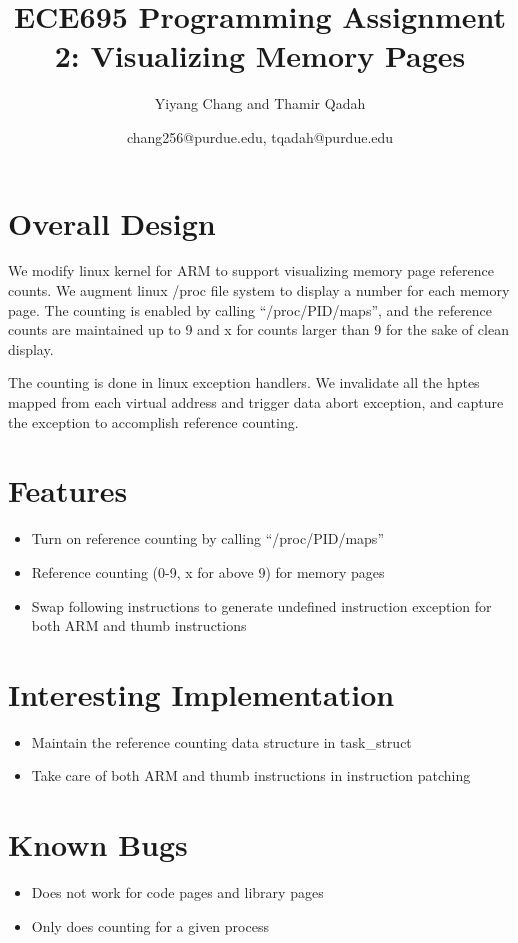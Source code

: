 \documentclass[11pt]{article}
\title{ECE695 Programming Assignment 2: Visualizing Memory Pages}
\author{Yiyang Chang and Thamir Qadah}
\date{chang256@purdue.edu, tqadah@purdue.edu}
\theoremstyle{plain} \numberwithin{equation}{section}
\theoremstyle{definition}
\begin{document}

\maketitle

\section{Overall Design}
\vspace{-0.1in}
We modify linux kernel for ARM to support visualizing memory page reference
counts. We augment linux /proc file system to display a number for each memory
page. The counting is enabled by calling ``/proc/PID/maps'', and the reference
counts are maintained up to 9 and x for counts larger than 9 for the sake of
clean display. 

The counting is done in linux exception handlers. We invalidate all the hptes
mapped from each virtual address and trigger data abort exception, and capture
the exception to accomplish reference counting.

\section{Features}
\vspace{-0.1in}
\begin{itemize}
	\item Turn on reference counting by calling ``/proc/PID/maps''
	\item Reference counting (0-9, x for above 9) for memory pages
	\item Swap following instructions to generate undefined instruction
		exception for both ARM and thumb instructions 
	\end{itemize}

\section{Interesting Implementation}
\vspace{-0.1in}
\begin{itemize}
	\item Maintain the reference counting data structure in task\_struct
	\item Take care of both ARM and thumb instructions in instruction patching
\end{itemize}

\section{Known Bugs}
\vspace{-0.1in}
\begin{itemize}
	\item Does not work for code pages and library pages
	\item Only does counting for a given process
\end{itemize}
\end{document}
